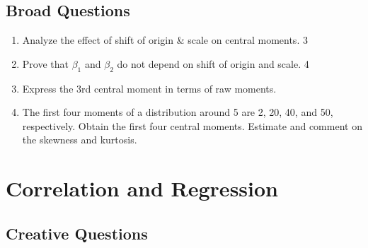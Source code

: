 \documentclass[a4paper,oneside]{book}
\begin{document}
\section{Broad Questions}
    \begin{enumerate}
    \item Analyze the effect of shift of origin \& scale on central moments. \hfill 3
    \item Prove that $\beta_1$ and $\beta_2$ do not depend on shift of origin and scale. \hfill 4
    \item Express the 3rd central moment in terms of raw moments. 
    \item The first four moments of a distribution around 5 are 2, 20, 40, and 50, respectively. Obtain the first four central moments. Estimate and comment on the skewness and kurtosis. 
    \end{enumerate}

\chapter{Correlation and Regression} 



\section{Creative Questions}
\end{document}
